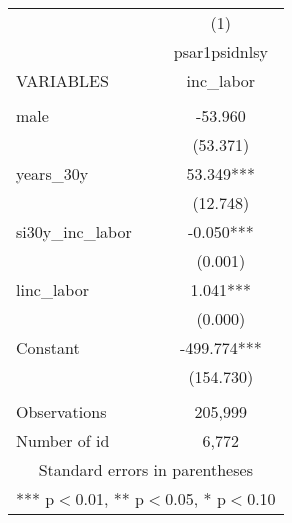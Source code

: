 \begin{tabular}{lc} \hline
 & (1) \\
 & psar1psidnlsy \\
VARIABLES & inc\_labor \\ \hline
 &  \\
male & -53.960 \\
 & (53.371) \\
years\_30y & 53.349*** \\
 & (12.748) \\
si30y\_inc\_labor & -0.050*** \\
 & (0.001) \\
linc\_labor & 1.041*** \\
 & (0.000) \\
Constant & -499.774*** \\
 & (154.730) \\
 &  \\
Observations & 205,999 \\
 Number of id & 6,772 \\ \hline
\multicolumn{2}{c}{ Standard errors in parentheses} \\
\multicolumn{2}{c}{ *** p$<$0.01, ** p$<$0.05, * p$<$0.10} \\
\end{tabular}
